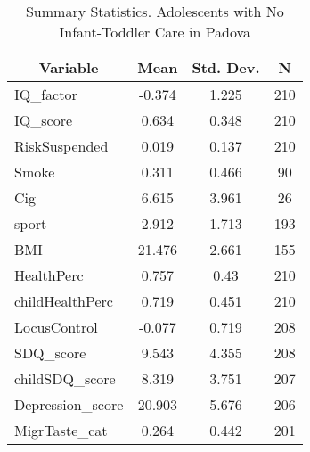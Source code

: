 
\begin{table}[htbp]\centering \caption{Summary Statistics. Adolescents with No Infant-Toddler Care in Padova \label{bothAdolasiloNonePadova}}
\begin{tabular}{l c c  c}\hline\hline
\multicolumn{1}{c}{\textbf{Variable}} & \textbf{Mean}
 & \textbf{Std. Dev.} & \textbf{N}\\ \hline
IQ\_factor & -0.374 & 1.225  & 210\\
IQ\_score & 0.634 & 0.348  & 210\\
RiskSuspended & 0.019 & 0.137  & 210\\
Smoke & 0.311 & 0.466  & 90\\
Cig & 6.615 & 3.961  & 26\\
sport & 2.912 & 1.713  & 193\\
BMI & 21.476 & 2.661  & 155\\
HealthPerc & 0.757 & 0.43  & 210\\
childHealthPerc & 0.719 & 0.451  & 210\\
LocusControl & -0.077 & 0.719  & 208\\
SDQ\_score & 9.543 & 4.355  & 208\\
childSDQ\_score & 8.319 & 3.751  & 207\\
Depression\_score & 20.903 & 5.676  & 206\\
MigrTaste\_cat & 0.264 & 0.442  & 201\\
\hline\end{tabular}
\end{table}
